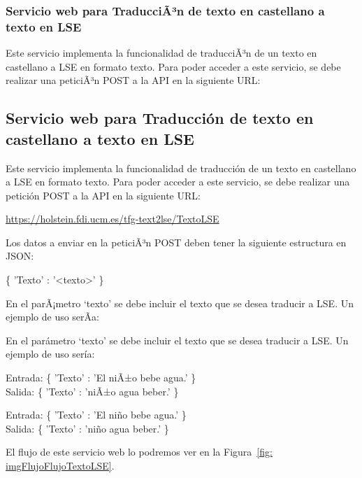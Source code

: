 \subsubsection{Servicio web para TraducciÃ³n de texto en castellano a texto en LSE}
Este servicio implementa la funcionalidad de traducciÃ³n de un texto en castellano a LSE en formato texto.
Para poder acceder a este servicio, se debe realizar una peticiÃ³n POST a la API en la siguiente URL:


\subsection{Servicio web para Traducción de texto en castellano a texto en LSE}
Este servicio implementa la funcionalidad de traducción de un texto en castellano a LSE en formato texto.
Para poder acceder a este servicio, se debe realizar una petición POST a la API en la siguiente URL:


\begin{shaded}
	\url{https://holstein.fdi.ucm.es/tfg-text2lse/TextoLSE}	
\end{shaded}


Los datos a enviar en la peticiÃ³n POST deben tener la siguiente estructura en JSON: 
\begin{center}
	
	\{ 'Texto' : '<texto>' \}
	
\end{center}


En el parÃ¡metro `texto' se debe incluir el texto que se desea traducir a LSE. Un ejemplo de uso serÃ­a: 
 

En el parámetro `texto' se debe incluir el texto que se desea traducir a LSE. Un ejemplo de uso sería: 




\begin{center}

 Entrada:  \{ 'Texto' : 'El niÃ±o bebe agua.' \}\\
 Salida:   \{ 'Texto' : 'niÃ±o agua beber.' \}

	Entrada:  \{ 'Texto' : 'El niño bebe agua.' \}\\
	Salida:   \{ 'Texto' : 'niño agua beber.' \}

\end{center}


El flujo de este servicio web lo podremos ver en la Figura~\ref {fig: imgFlujoFlujoTextoLSE}.



